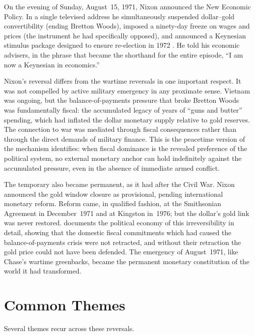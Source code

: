 \documentclass[12pt]{article}
\begin{document}
On the evening of Sunday, August~15, 1971, Nixon announced the New
Economic Policy.  In a single televised address he simultaneously
suspended dollar--gold convertibility (ending Bretton Woods), imposed a
ninety-day freeze on wages and prices (the instrument he had specifically
opposed), and announced a Keynesian stimulus package designed to ensure
re-election in 1972 \citep{Matusow1998}.  He told his economic advisers,
in the phrase that became the shorthand for the entire episode, ``I am
now a Keynesian in economics.''

Nixon's reversal differs from the wartime reversals in one important
respect.  It was not compelled by active military emergency in any
proximate sense.  Vietnam was ongoing, but the balance-of-payments
pressure that broke Bretton Woods was fundamentally fiscal: the
accumulated legacy of years of ``guns and butter'' spending, which had
inflated the dollar monetary supply relative to gold reserves.  The
connection to war was mediated through fiscal consequences rather than
through the direct demands of military finance.  This is the peacetime
version of the mechanism \citet{Sargent2011} identifies: when fiscal
dominance is the revealed preference of the political system, no external
monetary anchor can hold indefinitely against the accumulated pressure,
even in the absence of immediate armed conflict.

The temporary also became permanent, as it had after the Civil War.
Nixon announced the gold window closure as provisional, pending
international monetary reform.  Reform came, in qualified fashion, at
the Smithsonian Agreement in December~1971 and at Kingston in~1976; but
the dollar's gold link was never restored.  \citet{Gowa1983} documents
the political economy of this irreversibility in detail, showing that
the domestic fiscal commitments which had caused the balance-of-payments
crisis were not retracted, and without their retraction the gold price
could not have been defended.  The emergency of August~1971, like Chase's
wartime greenbacks, became the permanent monetary constitution of the
world it had transformed.


\section{Common Themes}

Several themes recur across these reversals.
\end{document}
